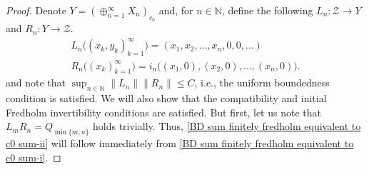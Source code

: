 \documentclass[11pt]{amsart}
\theoremstyle{definition}
\newcommand{\N}{\mathbb{N}}
\numberwithin{equation}{section}
\begin{document}
\begin{proof}
Denote $Y = (\oplus_{n=1}^\infty X_n)_{c_0}$ and, for $n\in\N$, define the following $L_n:\mathcal{Z}\to Y$ and $R_n:Y\to\mathcal{Z}$.
\begin{gather*}
    L_n\big((x_k,y_k)_{k=1}^\infty\big) = (x_1,x_2,\ldots,x_n,0,0,\ldots)\\
    R_n\big((x_k)_{k=1}^\infty\big) = i_n\big((x_1,0),(x_2,0),\ldots,(x_n,0)\big).
\end{gather*}
and note that $\sup_{n \in \mathbb{N}}\|L_n\|\|R_n\|\leq C$, i.e., the uniform boundedness condition is satisfied. We will also show that the compatibility and initial Fredholm invertibility conditions are satisfied. But first, let us note that $L_mR_n = Q_{\min\{m,n\}}$ holds trivially. Thus, \cref{BD sum finitely fredholm equivalent to c0 sum-ii} will follow immediately from \cref{BD sum finitely fredholm equivalent to c0 sum-i}.


\end{proof}
\end{document}
